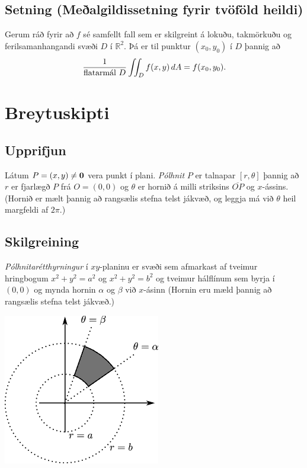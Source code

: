 \documentclass[a4paper,10pt,icelandic]{sphinxmanual}
\begin{document}
\subsection{Setning (Meðalgildissetning fyrir tvöföld heildi)}
\label{Kafli4:setning-mealgildissetning-fyrir-tvofold-heildi}
Gerum ráð fyrir að \(f\)
sé samfellt fall sem er skilgreint á lokuðu, takmörkuðu og ferilsamanhangandi
svæði \(D\) í \({\mathbb  R}^2\). Þá er til punktur
\((x_0,y_0)\) í \(D\) þannig að
\begin{gather}
\begin{split}\displaystyle \frac{1}{\mbox{flatarmál }D}\int\!\!\!\int_D f(x,y)\,dA=f(x_0,y_0).\end{split}\notag
\end{gather}

\section{Breytuskipti}
\label{Kafli4:breytuskipti}

\subsection{Upprifjun}
\label{Kafli4:upprifjun}
Látum \(P=(x,y)\neq \mbox{${\bf 0}$}\) vera punkt í plani. \emph{Pólhnit}
\(P\) er talnapar \([r,\theta]\) þannig að \(r\) er fjarlægð
\(P\) frá \(O=(0,0)\) og \(\theta\) er hornið á milli
striksins \(\overline{OP}\) og \(x\)-ássins. (Hornið er mælt
þannig að rangsælis stefna telst jákvæð, og leggja má við \(\theta\)
heil margfeldi af \(2\pi\).)


\subsection{Skilgreining}
\label{Kafli4:id10}
\emph{Pólhnitarétthyrningur} í \(xy\)-planinu er svæði sem afmarkast af
tveimur hringbogum \(x^2+y^2=a^2\) og \(x^2+y^2=b^2\) og tveimur
hálflínum sem byrja í \((0,0)\) og mynda hornin \(\alpha\) og
\(\beta\) við \(x\)-ásinn (Hornin eru mæld þannig að rangsælis
stefna telst jákvæð.)

{\hfill\includegraphics[width=0.400\linewidth]{polarrett.png}\hfill}
\end{document}
